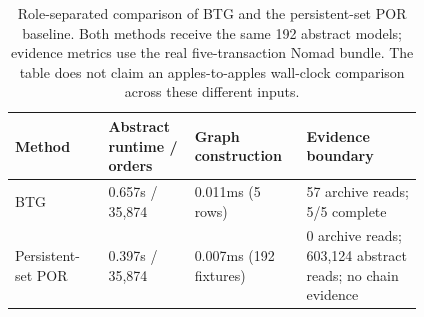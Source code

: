 \begin{table}[t]\centering\scriptsize
\caption{Role-separated comparison of BTG and the persistent-set POR baseline. Both methods receive the same 192 abstract models; evidence metrics use the real five-transaction Nomad bundle. The table does not claim an apples-to-apples wall-clock comparison across these different inputs.}
\label{tab:por-evidence}
\begin{tabular}{@{}p{0.20\linewidth}p{0.18\linewidth}p{0.18\linewidth}p{0.25\linewidth}@{}}\toprule
Method & Abstract runtime / orders & Graph construction & Evidence boundary \\ \midrule
BTG & 0.657s / 35,874 & 0.011ms (5 rows) & 57 archive reads; 5/5 complete \\
Persistent-set POR & 0.397s / 35,874 & 0.007ms (192 fixtures) & 0 archive reads; 603,124 abstract reads; no chain evidence \\
\bottomrule\end{tabular}
\end{table}
